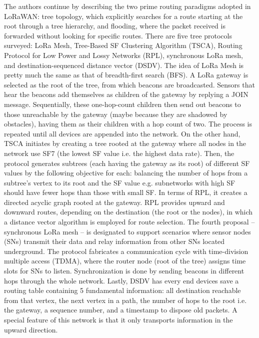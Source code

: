 \documentclass[12pt, a4paper, onside]{article}
\begin{document}
The authors continue by describing the two prime routing paradigms adopted in LoRaWAN: tree topology, which explicitly searches for a route starting at the root through a tree hierarchy, and flooding, where the packet received is forwarded without looking for specific routes. There are five tree protocols surveyed: LoRa Mesh, Tree-Based SF Clustering Algorithm (TSCA), Routing Protocol for Low Power and Lossy Networks (RPL), synchronous LoRa mesh, and destination-sequenced distance vector (DSDV). The idea of LoRa Mesh is pretty much the same as that of breadth-first search (BFS). A LoRa gateway is selected as the root of the tree, from which beacons are broadcasted. Sensors that hear the beacons add themselves as children of the gateway by replying a JOIN message. Sequentially, these one-hop-count children then send out beacons to those unreachable by the gateway (maybe because they are shadowed by obstacles), having them as their children with a hop count of two. The process is repeated until all devices are appended into the network. On the other hand, TSCA initiates by creating a tree rooted at the gateway where all nodes in the network use SF7 (the lowest SF value i.e. the highest data rate). Then, the protocol generates subtrees (each having the gateway as its root) of different SF values by the following objective for each: balancing the number of hops from a subtree's vertex to its root and the SF value e.g. subnetworks with high SF should have fewer hops than those with small SF. In terms of RPL, it creates a directed acyclic graph rooted at the gateway. RPL provides upward and downward routes, depending on the destination (the root or the nodes), in which a distance vector algorithm is employed for route selection. The fourth proposal -- synchronous LoRa mesh -- is designated to support scenarios where sensor nodes (SNs) transmit their data and relay information from other SNs located underground. The protocol fabricates a communication cycle with time-division multiple access (TDMA), where the router node (root of the tree) assigns time slots for SNs to listen. Synchronization is done by sending beacons in different hops through the whole network. Lastly, DSDV has every end devices save a routing table containing 5 fundamental information: all destination reachable from that vertex, the next vertex in a path, the number of hops to the root i.e. the gateway, a sequence number, and a timestamp to dispose old packets. A special feature of this network is that it only transports information in the upward direction.
\end{document}
